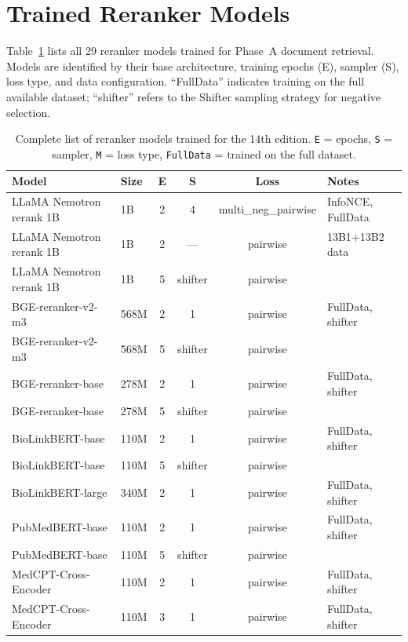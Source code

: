 
\appendix
\section{Trained Reranker Models}
\label{sec:appendix-models}

Table~\ref{tab:all-rerankers} lists all 29 reranker models trained for Phase~A document retrieval. Models are identified by their base architecture, training epochs (E), sampler (S), loss type, and data configuration. ``FullData'' indicates training on the full available dataset; ``shifter'' refers to the Shifter sampling strategy for negative selection.

\begin{table}[ht]
  \centering
  \caption{Complete list of reranker models trained for the 14th edition. \texttt{E} = epochs, \texttt{S} = sampler, \texttt{M} = loss type, \texttt{FullData} = trained on the full dataset.}
  \label{tab:all-rerankers}
  \begin{tabular}{llcccl}
    \toprule
    \textbf{Model} & \textbf{Size} & \textbf{E} & \textbf{S} & \textbf{Loss} & \textbf{Notes} \\
    \midrule
    LLaMA Nemotron rerank 1B & 1B & 2 & 4 & multi\_neg\_pairwise & InfoNCE, FullData \\
    LLaMA Nemotron rerank 1B & 1B & 2 & --- & pairwise & 13B1+13B2 data \\
    LLaMA Nemotron rerank 1B & 1B & 5 & shifter & pairwise & \\
    BGE-reranker-v2-m3 & 568M & 2 & 1 & pairwise & FullData, shifter \\
    BGE-reranker-v2-m3 & 568M & 5 & shifter & pairwise & \\
    BGE-reranker-base & 278M & 2 & 1 & pairwise & FullData, shifter \\
    BGE-reranker-base & 278M & 5 & shifter & pairwise & \\
    BioLinkBERT-base & 110M & 2 & 1 & pairwise & FullData, shifter \\
    BioLinkBERT-base & 110M & 5 & shifter & pairwise & \\
    BioLinkBERT-large & 340M & 2 & 1 & pairwise & FullData, shifter \\
    PubMedBERT-base & 110M & 2 & 1 & pairwise & FullData, shifter \\
    PubMedBERT-base & 110M & 5 & shifter & pairwise & \\
    MedCPT-Cross-Encoder & 110M & 2 & 1 & pairwise & FullData, shifter \\
    MedCPT-Cross-Encoder & 110M & 3 & 1 & pairwise & FullData, shifter \\

\end{tabular}
\end{table}
